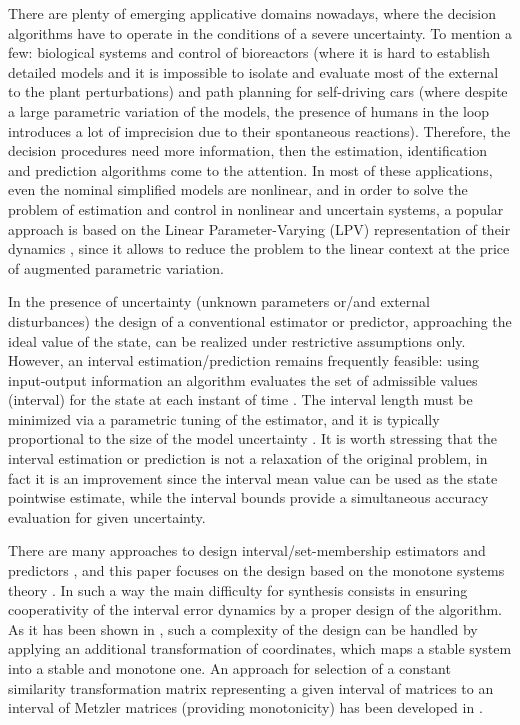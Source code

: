 \documentclass[letterpaper, 10 pt, conference]{ieeeconf}
\theoremstyle{plain}
\theoremstyle{definition}
\theoremstyle{plain}
\theoremstyle{plain}
\theoremstyle{remark}
\begin{document}
There are plenty of emerging applicative domains nowadays, where the decision algorithms have to operate in the conditions of a severe uncertainty. To mention a few: biological systems and control of bioreactors (where it is hard to establish detailed models and it is impossible to isolate and evaluate most of the external to the plant perturbations) and path planning for self-driving cars (where despite a large parametric variation of the models, the presence of humans in the loop introduces a lot of imprecision due to their spontaneous reactions). Therefore, the decision procedures need more information, then the estimation, identification and prediction algorithms come to the attention. In most of these applications, even the nominal simplified models are nonlinear, and in order to solve the problem of estimation and control in nonlinear and uncertain systems, a popular approach is based on the Linear Parameter-Varying (LPV) representation of their dynamics \cite{Shamma2012,Marcos_Balas04,Shamma_Cloutier93,Tan97}, since it allows to reduce the problem to the linear context at the price of augmented parametric variation.

In the presence of uncertainty (unknown parameters or/and external disturbances) the design of a conventional estimator or predictor, approaching the ideal value of the state, can be realized under restrictive assumptions only. However, an interval estimation/prediction remains frequently feasible: using input-output information an algorithm evaluates the set of admissible values (interval) for the state at each instant of time \cite{Efimov2016,Raiessi2018}. The interval length must be minimized via a parametric tuning of the estimator, and it is typically proportional to the size of the model uncertainty \cite{Chebotarev2015}. It is worth stressing that the interval estimation or prediction is not a relaxation of the original problem, in fact it is an improvement since the interval mean value can be used as the state pointwise estimate, while the interval bounds provide a simultaneous accuracy evaluation for given uncertainty.

There are many approaches to design interval/set-membership estimators and predictors \cite{Jaulin02,Kieffer_Walter04,Bernard_Gouze04,Moisan_Bernard_Gouze09}, and this paper focuses on the design based on the monotone systems theory \cite{Bernard_Gouze04,Moisan_Bernard_Gouze09,RVZ10,REZ11,Efimov_a2012}.
In such a way the main difficulty for synthesis consists in ensuring cooperativity of the interval error dynamics by a proper design of the algorithm. As it has been shown in \cite{MazencBernard11,REZ11,Combastel2012}, such a complexity of the design can be handled by applying an additional transformation of coordinates, which maps a stable system into a stable and monotone one. An approach for selection of a constant similarity transformation matrix representing a given interval of matrices to an interval of Metzler matrices (providing monotonicity) has been developed in \cite{Efimov_a2013,Chebotarev2015}. 
\end{document}
